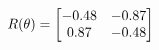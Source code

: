 \documentclass[preview]{standalone}
\begin{document}
\begin{align*}
\special{dvisvgm:raw <g id='unique000'>}R(\theta) = \begin{bmatrix}-0.48 & -0.87\\0.87 & -0.48\end{bmatrix}\special{dvisvgm:raw </g>}
\end{align*}
\end{document}
